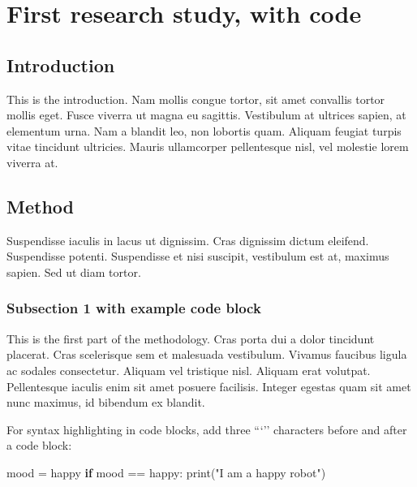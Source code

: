 \documentclass[12pt,a4paper,]{report}
\newenvironment{Shaded}{}{}
\newcommand{\BuiltInTok}[1]{\textcolor[rgb]{0.00,0.50,0.00}{#1}}
\newcommand{\ControlFlowTok}[1]{\textcolor[rgb]{0.00,0.44,0.13}{\textbf{#1}}}
\newcommand{\NormalTok}[1]{#1}
\newcommand{\OperatorTok}[1]{\textcolor[rgb]{0.40,0.40,0.40}{#1}}
\newcommand{\StringTok}[1]{\textcolor[rgb]{0.25,0.44,0.63}{#1}}
\begin{document}
\hypertarget{first-research-study-with-code}{%
\chapter{First research study, with
code}\label{first-research-study-with-code}}

\hypertarget{introduction-1}{%
\section{Introduction}\label{introduction-1}}

This is the introduction. Nam mollis congue tortor, sit amet convallis
tortor mollis eget. Fusce viverra ut magna eu sagittis. Vestibulum at
ultrices sapien, at elementum urna. Nam a blandit leo, non lobortis
quam. Aliquam feugiat turpis vitae tincidunt ultricies. Mauris
ullamcorper pellentesque nisl, vel molestie lorem viverra at.

\hypertarget{method}{%
\section{Method}\label{method}}

Suspendisse iaculis in lacus ut dignissim. Cras dignissim dictum
eleifend. Suspendisse potenti. Suspendisse et nisi suscipit, vestibulum
est at, maximus sapien. Sed ut diam tortor.

\hypertarget{subsection-1-with-example-code-block}{%
\subsection{Subsection 1 with example code
block}\label{subsection-1-with-example-code-block}}

This is the first part of the methodology. Cras porta dui a dolor
tincidunt placerat. Cras scelerisque sem et malesuada vestibulum.
Vivamus faucibus ligula ac sodales consectetur. Aliquam vel tristique
nisl. Aliquam erat volutpat. Pellentesque iaculis enim sit amet posuere
facilisis. Integer egestas quam sit amet nunc maximus, id bibendum ex
blandit.

For syntax highlighting in code blocks, add three ```'' characters
before and after a code block:

\begin{Shaded}
\begin{Highlighting}[]
\NormalTok{mood }\OperatorTok{=} \StringTok{\textquotesingle{}happy\textquotesingle{}}
\ControlFlowTok{if}\NormalTok{ mood }\OperatorTok{==} \StringTok{\textquotesingle{}happy\textquotesingle{}}\NormalTok{:}
    \BuiltInTok{print}\NormalTok{(}\StringTok{"I am a happy robot"}\NormalTok{)}
\end{Highlighting}
\end{Shaded}
\end{document}
